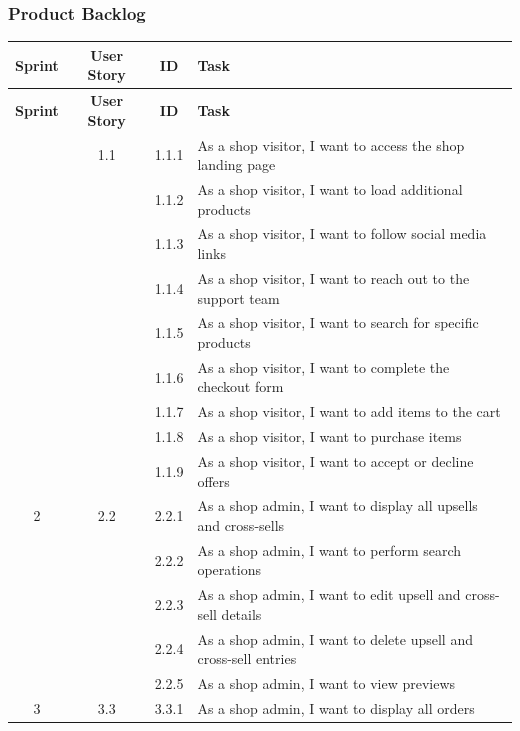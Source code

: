 \subsubsection{Product Backlog}

\begin{longtable}{|c|c|c|p{10cm}|}
\hline
\textbf{Sprint} & \textbf{User Story} & \textbf{ID} & \textbf{Task} \\ 
\hline
\endfirsthead

\hline
\textbf{Sprint} & \textbf{User Story} & \textbf{ID} & \textbf{Task} \\ 
\hline
\endhead

\hline
\endfoot

\hline
\endlastfoot

\multirow{1}{*}{1} & \multirow{1}{*}{1.1} & 1.1.1 & As a shop visitor, I want to access the shop landing page \\ \cline{3-4}
& & 1.1.2 & As a shop visitor, I want to load additional products \\ \cline{3-4}
& & 1.1.3 & As a shop visitor, I want to follow social media links \\ \cline{3-4}
& & 1.1.4 & As a shop visitor, I want to reach out to the support team \\ \cline{3-4}
& & 1.1.5 & As a shop visitor, I want to search for specific products \\ \cline{3-4}
& & 1.1.6 & As a shop visitor, I want to complete the checkout form \\ \cline{3-4}
& & 1.1.7 & As a shop visitor, I want to add items to the cart \\ \cline{3-4}
& & 1.1.8 & As a shop visitor, I want to purchase items \\ \cline{3-4}
& & 1.1.9 & As a shop visitor, I want to accept or decline offers \\ \hline
\multirow{1}{*}{2} & \multirow{1}{*}{2.2} & 2.2.1 & As a shop admin, I want to display all upsells and cross-sells \\ \cline{3-4}
& & 2.2.2 & As a shop admin, I want to perform search operations \\ \cline{3-4}
& & 2.2.3 & As a shop admin, I want to edit upsell and cross-sell details \\ \cline{3-4}
& & 2.2.4 & As a shop admin, I want to delete upsell and cross-sell entries \\ \cline{3-4}
& & 2.2.5 & As a shop admin, I want to view previews \\ \hline
\multirow{1}{*}{3} & \multirow{1}{*}{3.3} & 3.3.1 & As a shop admin, I want to display all orders \\ \cline{3-4}

\end{longtable}
